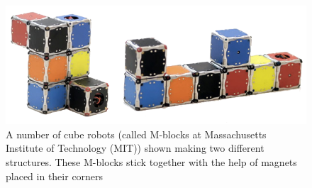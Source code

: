 %
\begin{figure}[H]
	\centering
	\includegraphics[scale=0.4]{figures/m-blocks2}
	\caption{A number of cube robots (called M-blocks at Massachusetts Institute of Technology (MIT)) shown making two different structures. These M-blocks stick together with the help of magnets placed in their corners \cite{LRosen}}
	\label{MBlocksExample}
\end{figure}
%
